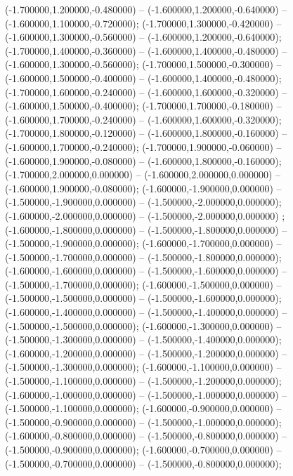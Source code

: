  (-1.700000,1.200000,-0.480000) -- (-1.600000,1.200000,-0.640000) -- (-1.600000,1.100000,-0.720000);
 (-1.700000,1.300000,-0.420000) -- (-1.600000,1.300000,-0.560000) -- (-1.600000,1.200000,-0.640000);
 (-1.700000,1.400000,-0.360000) -- (-1.600000,1.400000,-0.480000) -- (-1.600000,1.300000,-0.560000);
 (-1.700000,1.500000,-0.300000) -- (-1.600000,1.500000,-0.400000) -- (-1.600000,1.400000,-0.480000);
 (-1.700000,1.600000,-0.240000) -- (-1.600000,1.600000,-0.320000) -- (-1.600000,1.500000,-0.400000);
 (-1.700000,1.700000,-0.180000) -- (-1.600000,1.700000,-0.240000) -- (-1.600000,1.600000,-0.320000);
 (-1.700000,1.800000,-0.120000) -- (-1.600000,1.800000,-0.160000) -- (-1.600000,1.700000,-0.240000);
 (-1.700000,1.900000,-0.060000) -- (-1.600000,1.900000,-0.080000) -- (-1.600000,1.800000,-0.160000);
 (-1.700000,2.000000,0.000000) -- (-1.600000,2.000000,0.000000) -- (-1.600000,1.900000,-0.080000);
 (-1.600000,-1.900000,0.000000) -- (-1.500000,-1.900000,0.000000) -- (-1.500000,-2.000000,0.000000);
 (-1.600000,-2.000000,0.000000) -- (-1.500000,-2.000000,0.000000) ;
 (-1.600000,-1.800000,0.000000) -- (-1.500000,-1.800000,0.000000) -- (-1.500000,-1.900000,0.000000);
 (-1.600000,-1.700000,0.000000) -- (-1.500000,-1.700000,0.000000) -- (-1.500000,-1.800000,0.000000);
 (-1.600000,-1.600000,0.000000) -- (-1.500000,-1.600000,0.000000) -- (-1.500000,-1.700000,0.000000);
 (-1.600000,-1.500000,0.000000) -- (-1.500000,-1.500000,0.000000) -- (-1.500000,-1.600000,0.000000);
 (-1.600000,-1.400000,0.000000) -- (-1.500000,-1.400000,0.000000) -- (-1.500000,-1.500000,0.000000);
 (-1.600000,-1.300000,0.000000) -- (-1.500000,-1.300000,0.000000) -- (-1.500000,-1.400000,0.000000);
 (-1.600000,-1.200000,0.000000) -- (-1.500000,-1.200000,0.000000) -- (-1.500000,-1.300000,0.000000);
 (-1.600000,-1.100000,0.000000) -- (-1.500000,-1.100000,0.000000) -- (-1.500000,-1.200000,0.000000);
 (-1.600000,-1.000000,0.000000) -- (-1.500000,-1.000000,0.000000) -- (-1.500000,-1.100000,0.000000);
 (-1.600000,-0.900000,0.000000) -- (-1.500000,-0.900000,0.000000) -- (-1.500000,-1.000000,0.000000);
 (-1.600000,-0.800000,0.000000) -- (-1.500000,-0.800000,0.000000) -- (-1.500000,-0.900000,0.000000);
 (-1.600000,-0.700000,0.000000) -- (-1.500000,-0.700000,0.000000) -- (-1.500000,-0.800000,0.000000);
